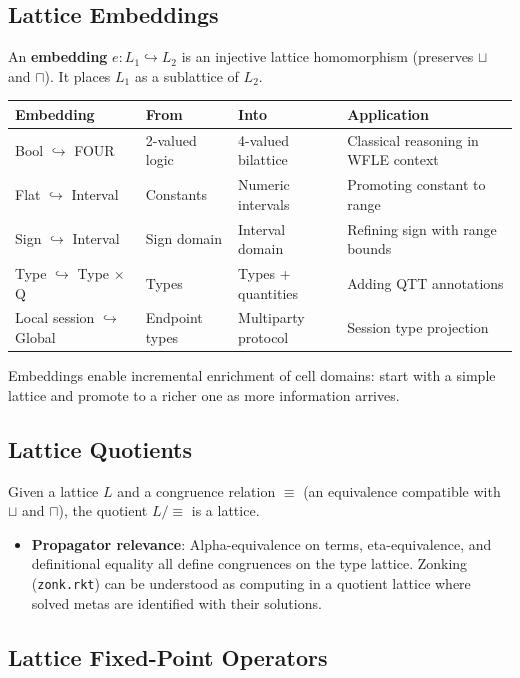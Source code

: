 \documentclass[11pt]{article}
\begin{document}
\subsection{Lattice Embeddings}
\label{sec:org41f5ee5}

An \textbf{embedding} \(e : L_1 \hookrightarrow L_2\) is an injective lattice homomorphism
(preserves \(\sqcup\) and \(\sqcap\)). It places \(L_1\) as a sublattice of \(L_2\).

\begin{center}
\begin{tabular}{llll}
Embedding & From & Into & Application\\
\hline
Bool \(\hookrightarrow\) FOUR & 2-valued logic & 4-valued bilattice & Classical reasoning in WFLE context\\
Flat \(\hookrightarrow\) Interval & Constants & Numeric intervals & Promoting constant to range\\
Sign \(\hookrightarrow\) Interval & Sign domain & Interval domain & Refining sign with range bounds\\
Type \(\hookrightarrow\) Type \(\times\) Q & Types & Types + quantities & Adding QTT annotations\\
Local session \(\hookrightarrow\) Global & Endpoint types & Multiparty protocol & Session type projection\\
\end{tabular}
\end{center}

Embeddings enable incremental enrichment of cell domains: start with a simple
lattice and promote to a richer one as more information arrives.
\subsection{Lattice Quotients}
\label{sec:org3451f95}

Given a lattice \(L\) and a congruence relation \(\equiv\) (an equivalence compatible
with \(\sqcup\) and \(\sqcap\)), the quotient \(L / \equiv\) is a lattice.

\begin{itemize}
\item \textbf{Propagator relevance}: Alpha-equivalence on terms, eta-equivalence, and
definitional equality all define congruences on the type lattice. Zonking
(\texttt{zonk.rkt}) can be understood as computing in a quotient lattice where
solved metas are identified with their solutions.
\end{itemize}
\subsection{Lattice Fixed-Point Operators}
\label{sec:org3732d6b}
\end{document}
